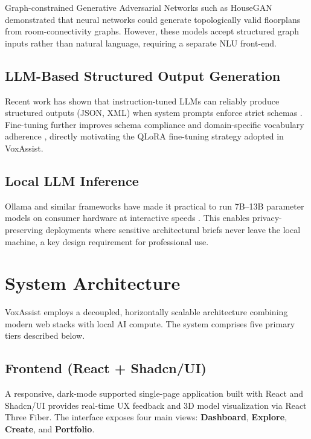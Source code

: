 \documentclass[12pt, a4paper]{article}
\begin{document}
Graph-constrained Generative Adversarial Networks such as HouseGAN
\cite{nauata2020house} demonstrated that neural networks could generate
topologically valid floorplans from room-connectivity graphs. However, these
models accept structured graph inputs rather than natural language, requiring a
separate NLU front-end.

\subsection{LLM-Based Structured Output Generation}

Recent work has shown that instruction-tuned LLMs can reliably produce structured
outputs (JSON, XML) when system prompts enforce strict schemas
\cite{brown2020language}. Fine-tuning further improves schema compliance and
domain-specific vocabulary adherence \cite{hu2022lora}, directly motivating the
QLoRA fine-tuning strategy adopted in VoxAssist.

\subsection{Local LLM Inference}

Ollama and similar frameworks have made it practical to run 7B--13B parameter
models on consumer hardware at interactive speeds \cite{touvron2023llama}.
This enables privacy-preserving deployments where sensitive architectural briefs
never leave the local machine, a key design requirement for professional use.

\section{System Architecture}

VoxAssist employs a decoupled, horizontally scalable architecture combining
modern web stacks with local AI compute. The system comprises five primary tiers
described below.

\subsection{Frontend (React + Shadcn/UI)}

A responsive, dark-mode supported single-page application built with React and
Shadcn/UI provides real-time UX feedback and 3D model visualization via React
Three Fiber. The interface exposes four main views: \textbf{Dashboard},
\textbf{Explore}, \textbf{Create}, and \textbf{Portfolio}.
\end{document}
